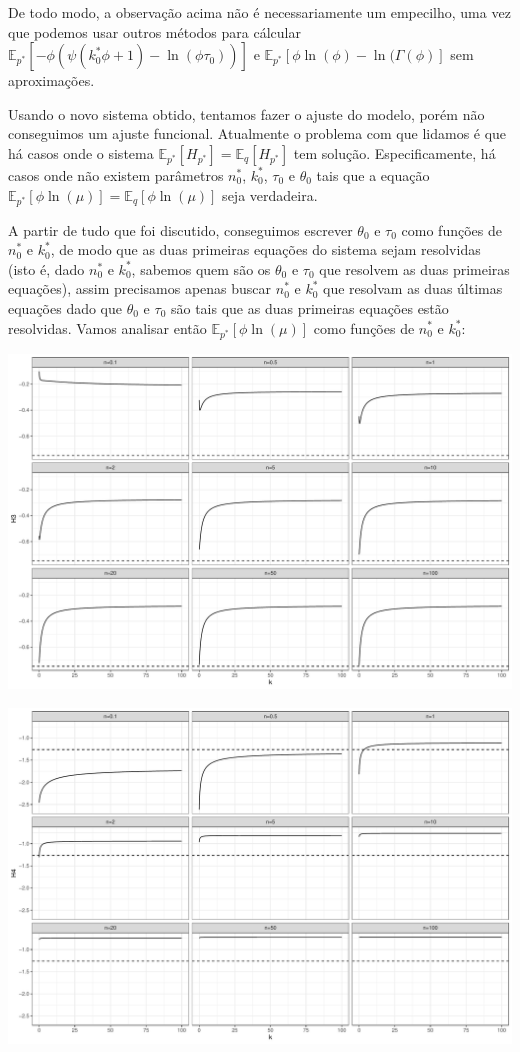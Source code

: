 \documentclass[
]{article}
\begin{document}
De todo modo, a observação acima não é necessariamente um empecilho, uma
vez que podemos usar outros métodos para cálcular
\(\mathbb{E}_{p^*}[-\phi(\psi(k^*_0\phi+1)-\ln(\phi\tau_0))]\) e
\(\mathbb{E}_{p^*}[\phi\ln(\phi)-\ln(\Gamma(\phi)]\) sem aproximações.

Usando o novo sistema obtido, tentamos fazer o ajuste do modelo, porém
não conseguimos um ajuste funcional. Atualmente o problema com que
lidamos é que há casos onde o sistema
\(\mathbb{E}_{p^*}[H_{p^*}]=\mathbb{E}_{q}[H_{p^*}]\) tem solução.
Especificamente, há casos onde não existem parâmetros \(n^*_0\),
\(k^*_0\), \(\tau_0\) e \(\theta_0\) tais que a equação
\(\mathbb{E}_{p^*}[\phi\ln(\mu)]=\mathbb{E}_{q}[\phi\ln(\mu)]\) seja
verdadeira.

A partir de tudo que foi discutido, conseguimos escrever \(\theta_0\) e
\(\tau_0\) como funções de \(n^*_0\) e \(k^*_0\), de modo que as duas
primeiras equações do sistema sejam resolvidas (isto é, dado \(n^*_0\) e
\(k^*_0\), sabemos quem são os \(\theta_0\) e \(\tau_0\) que resolvem as
duas primeiras equações), assim precisamos apenas buscar \(n^*_0\) e
\(k^*_0\) que resolvam as duas últimas equações dado que \(\theta_0\) e
\(\tau_0\) são tais que as duas primeiras equações estão resolvidas.
Vamos analisar então \(\mathbb{E}_{p^*}[\phi\ln(\mu)]\) como funções de
\(n^*_0\) e \(k^*_0\):

\includegraphics{caso_gamma_revisto_files/figure-latex/unnamed-chunk-3-1.pdf}

\includegraphics{caso_gamma_revisto_files/figure-latex/unnamed-chunk-4-1.pdf}
\end{document}
